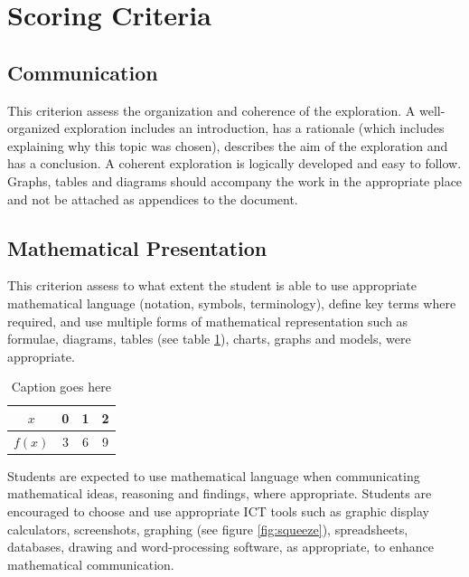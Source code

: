 \documentclass[11pt]{article}
\begin{document}
\section{Scoring Criteria}

\subsection{Communication}
This criterion assess the organization and coherence of the exploration. A well-organized exploration includes an introduction, has a rationale (which includes explaining why this topic was chosen), describes the aim of the exploration and has a conclusion. A coherent exploration is logically developed and easy to follow. Graphs, tables and diagrams should accompany the work in the appropriate place and not be attached as appendices to the document.

\subsection{Mathematical Presentation}
This criterion assess to what extent the student is able to use appropriate mathematical language (notation, symbols, terminology), define key terms where required, and use multiple forms of mathematical representation such as formulae, diagrams, tables (see table \ref{tab:data1}), charts, graphs and models, were appropriate.\\

\begin{table}[H]
	\centering
		\begin{tabular}{|c|c|c|c|}\hline
			$x$ & 0 & 1 & 2\\ \hline
			$f(x)$ & 3 & 6 & 9\\ \hline		
		\end{tabular}
	\caption{Caption goes here}
	\label{tab:data1}
\end{table}

Students are expected to use mathematical language when communicating mathematical ideas, reasoning and findings, where appropriate. Students are encouraged to choose and use appropriate ICT tools such as graphic display calculators, screenshots, graphing (see figure \ref{fig:squeeze}), spreadsheets, databases, drawing and word-processing software, as appropriate, to enhance mathematical communication.\\
\end{document}
